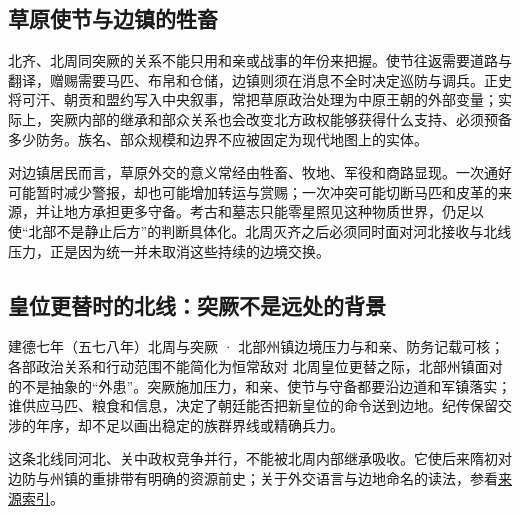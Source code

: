\subsection{草原使节与边镇的牲畜}

北齐、北周同突厥的关系不能只用和亲或战事的年份来把握。使节往返需要道路与翻译，赠赐需要马匹、布帛和仓储，边镇则须在消息不全时决定巡防与调兵。正史将可汗、朝贡和盟约写入中央叙事，常把草原政治处理为中原王朝的外部变量；实际上，突厥内部的继承和部众关系也会改变北方政权能够获得什么支持、必须预备多少防务。族名、部众规模和边界不应被固定为现代地图上的实体。

对边镇居民而言，草原外交的意义常经由牲畜、牧地、军役和商路显现。一次通好可能暂时减少警报，却也可能增加转运与赏赐；一次冲突可能切断马匹和皮革的来源，并让地方承担更多守备。考古和墓志只能零星照见这种物质世界，仍足以使“北部不是静止后方”的判断具体化。北周灭齐之后必须同时面对河北接收与北线压力，正是因为统一并未取消这些持续的边境交换。

\subsection{皇位更替时的北线：突厥不是远处的背景}
\begin{event}{}{建德七年（五七八年）}{北周与突厥 · 北部州镇}{边境压力与和亲、防务记载可核；各部政治关系和行动范围不能简化为恒常敌对}
北周皇位更替之际，北部州镇面对的不是抽象的“外患”。突厥施加压力，和亲、使节与守备都要沿边道和军镇落实；谁供应马匹、粮食和信息，决定了朝廷能否把新皇位的命令送到边地。纪传保留交涉的年序，却不足以画出稳定的族群界线或精确兵力。

这条北线同河北、关中政权竞争并行，不能被北周内部继承吸收。它使后来隋初对边防与州镇的重排带有明确的资源前史；关于外交语言与边地命名的读法，参看\hyperref[app:sources]{来源索引}。
\end{event}